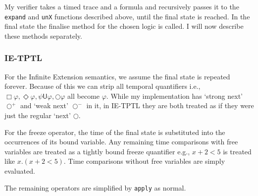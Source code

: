 \documentclass[a4paper]{article}
\newcommand{\U}{\mathsf{U}}
\newcommand{\sn}{\bigcirc^+}
\newcommand{\wn}{\bigcirc^-}
\begin{document}
My verifier takes a timed trace and a formula and recursively passes it to the \texttt{expand} and \texttt{unX} functions described above, until the final state is reached. In the final state the finalise method for the chosen logic is called. I will now describe these methods separately.

\subsubsection{IE-TPTL}
For the Infinite Extension semantics, we assume the final state is repeated forever. Because of this we can strip all temporal quantifiers i.e., $\Box \varphi, \Diamond \varphi, \psi \U \varphi, \bigcirc \varphi$ all become $\varphi$. While my implementation has `strong next' $\sn$ and `weak next' $\wn$ in it, in IE-TPTL they are both treated as if they were just the regular `next' $\bigcirc$.

For the freeze operator, the time of the final state is substituted into the occurrences of its bound variable. Any remaining time comparisons with free variables are treated as a tightly bound freeze quantifier e.g., $x + 2 < 5$ is treated like $x. (x + 2 < 5)$. Time comparisons without free variables are simply evaluated.

The remaining operators are simplified by \texttt{apply} as normal.

\end{document}
